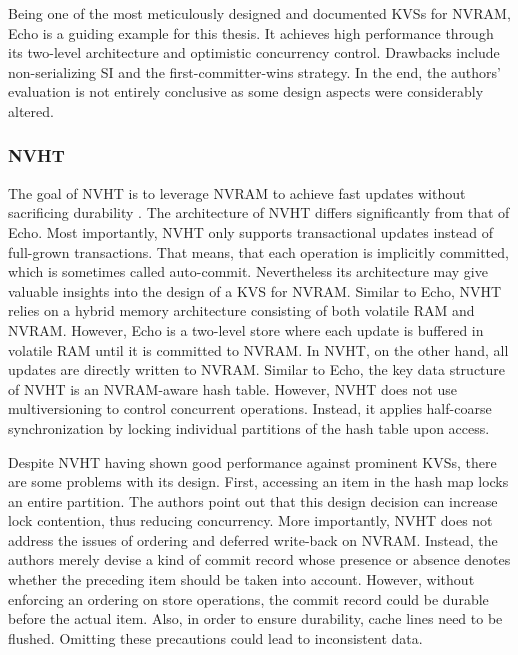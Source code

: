 Being one of the most meticulously designed and documented \acp{KVS} for
\ac{NVRAM}, Echo is a guiding example for this thesis. It achieves high
performance through its two-level architecture and optimistic concurrency
control. Drawbacks include non-serializing \ac{SI} and the first-committer-wins
strategy. In the end, the authors' evaluation is not entirely conclusive as some
design aspects were considerably altered.

\subsubsection{NVHT}

The goal of NVHT is to leverage \ac{NVRAM} to achieve fast updates without
sacrificing durability \cite{zhou2016nvht}. The architecture of NVHT differs
significantly from that of Echo. Most importantly, NVHT only supports
transactional updates instead of full-grown transactions. That means, that each
operation is implicitly committed, which is sometimes called auto-commit.
Nevertheless its architecture may give valuable insights into the design of a
\ac{KVS} for \ac{NVRAM}. Similar to Echo, NVHT relies on a hybrid memory
architecture consisting of both volatile \ac{RAM} and \ac{NVRAM}. However, Echo
is a two-level store where each update is buffered in volatile \ac{RAM} until it
is committed to \ac{NVRAM}. In NVHT, on the other hand, all updates are directly
written to \ac{NVRAM}. Similar to Echo, the key data structure of NVHT is an
\ac{NVRAM}-aware hash table. However, NVHT does not use multiversioning to
control concurrent operations. Instead, it applies half-coarse synchronization
by locking individual partitions of the hash table upon access.

Despite NVHT having shown good performance against prominent \acp{KVS}, there are
some problems with its design. First, accessing an item in the hash map locks an
entire partition. The authors point out that this design decision can increase
lock contention, thus reducing concurrency. More importantly, NVHT does not
address the issues of ordering and deferred write-back on \ac{NVRAM}. Instead,
the authors merely devise a kind of commit record whose presence or absence
denotes whether the preceding item should be taken into account. However,
without enforcing an ordering on store operations, the commit record could be
durable before the actual item. Also, in order to ensure durability, cache lines
need to be flushed. Omitting these precautions could lead to inconsistent data.

